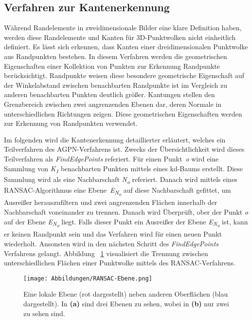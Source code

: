 \subsection{Verfahren zur Kantenerkennung} \label{edge_detection_reprod}
Während Randelemente in zweidimensionale Bilder eine klare Definition haben, werden diese Randelemente und Kanten für 3D-Punktwolken nicht einheitlich definiert. Es lässt sich erkennen, dass Kanten einer dreidimensionalen Punktwolke aus Randpunkten bestehen. In diesem Verfahren werden die geometrischen Eigenschaften einer Kollektion von Punkten zur Erkennung Randpunkte berücksichtigt. Randpunkte weisen diese besondere geometrische Eigenschaft auf \textendash{} der Winkelabstand zwischen benachbarten Randpunkte ist im Vergleich zu anderen benachbarten Punkten deutlich größer. Kantungen stellen den Grenzbereich zwischen zwei angrenzenden Ebenen dar, deren Normale in unterschiedlichen Richtungen zeigen. Diese geometrischen Eigenschaften werden zur Erkennung von Randpunkten verwendet. \autocite[1-2]{ni_edge_2016}

Im folgenden wird die Kantenerkennung detaillierter erläutert, welches ein Teilverfahren des AGPN-Verfahrens ist. Zwecks der Übersichtlichkeit wird dieses Teilverfahren als \textit{FindEdgePoints} referiert. Für einen Punkt~\textit{o} wird eine Sammlung von \textit{K\textsubscript{1}} benachbarten Punkten mittels eines kd-Baums erstellt. Diese Sammlung wird als eine Nachbarschaft \textit{N\textsubscript{o}} referiert. Danach wird mittels eines RANSAC-Algorithmus eine Ebene~\textit{E\textsubscript{N\textsubscript{o}}} auf diese Nachbarschaft gefittet, um Ausreißer herauszufiltern und zwei angrenzenden Flächen innerhalb der Nachbarschaft voneinander zu trennen. Danach wird Überprüft, ober der Punkt \textit{o} auf der Ebene \textit{E\textsubscript{N\textsubscript{o}}} liegt. Falls dieser Punkt ein Ausreißer der Ebene \textit{E\textsubscript{N\textsubscript{o}}} ist, kann er keinen Randpunkt sein und das Verfahren wird für einen neuen Punkt wiederholt. Ansonsten wird in den nächsten Schritt des \textit{FindEdgePoints} Verfahrens gelangt. Abbildung ~\ref{RANSAC-Ebene} visualisiert die Trennung zwischen unterschiedlichen Flächen einer Punktwolke mittels des RANSAC-Verfahrens. 

\begin{figure}[h]
	\texttt{[image: Abbildungen/RANSAC-Ebene.png]}
	\centering
	\caption{Eine lokale Ebene (rot dargestellt) neben anderen Oberflächen (blau dargestellt). In \textbf{(a)} sind drei Ebenen zu sehen, wobei in \textbf{(b)} nur zwei zu sehen sind. \autocite{ni_edge_2016}}
	\label{RANSAC-Ebene}
\end{figure} 

